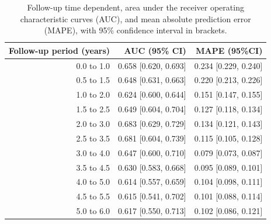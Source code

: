 \begin{table}[!htb]
\begin{center}
\caption{Follow-up time dependent, area under the receiver operating characteristic curves (AUC), and mean absolute prediction error (MAPE), with 95\% confidence interval in brackets.}
\label{tab:AUC_PE}
\begin{tabular}{r|r|r}
\hline
\hline
Follow-up period (years) & AUC (95\% CI) & MAPE (95\%CI)\\ 
\hline
0.0 to 1.0 & 0.658 [0.620, 0.693] & 0.234 [0.229, 0.240]\\
0.5 to 1.5 & 0.648 [0.631, 0.663] & 0.220 [0.213, 0.226]\\
1.0 to 2.0 & 0.624 [0.600, 0.644] & 0.151 [0.147, 0.155]\\
1.5 to 2.5 & 0.649 [0.604, 0.704] & 0.127 [0.118, 0.134]\\
2.0 to 3.0 & 0.683 [0.629, 0.729] & 0.134 [0.121, 0.143]\\
2.5 to 3.5 & 0.681 [0.604, 0.739] & 0.115 [0.105, 0.128]\\
3.0 to 4.0 & 0.647 [0.600, 0.710] & 0.079 [0.073, 0.087]\\
3.5 to 4.5 & 0.630 [0.583, 0.668] & 0.095 [0.089, 0.101]\\
4.0 to 5.0 & 0.614 [0.557, 0.659] & 0.104 [0.098, 0.111]\\
4.5 to 5.5 & 0.615 [0.541, 0.702] & 0.101 [0.088, 0.114]\\
5.0 to 6.0 & 0.617 [0.550, 0.713] & 0.102 [0.086, 0.121]\\
\hline
\end{tabular}	
\end{center}
\end{table}